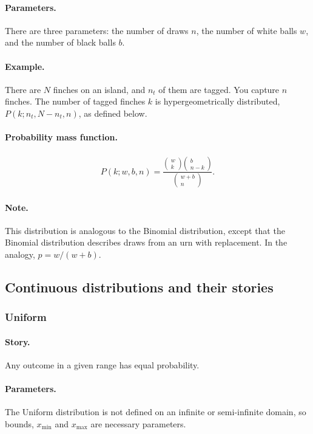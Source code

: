 \paragraph{Parameters.} There are three parameters: the number of
draws $n$, the number of white balls $w$, and the number of black
balls $b$.
\paragraph{Example.} There are $N$ finches on an island, and $n_t$ of
them are tagged.  You capture $n$ finches.  The number of tagged
finches $k$ is hypergeometrically distributed, $P(k;n_t, N-n_t, n)$,
as defined below.
\paragraph{Probability mass function.}
\begin{align}
P(k;w, b, n) = \frac{\begin{pmatrix}w\\k\end{pmatrix}\begin{pmatrix}b\\n-k\end{pmatrix}}
{\begin{pmatrix}w+b\\n\end{pmatrix}}.
\end{align}
\paragraph{Note.} This distribution is analogous to the Binomial
distribution, except that the Binomial distribution describes draws
from an urn with replacement.  In the analogy, $p = w/(w+b)$.


\subsection{Continuous distributions and their stories}

\subsubsection{Uniform}
\paragraph{Story.} Any outcome in a given range has equal probability.
\paragraph{Parameters.} The Uniform distribution is not defined on an
infinite or semi-infinite domain, so bounds, $x_\mathrm{min}$ and
$x_\mathrm{max}$ are necessary parameters.
